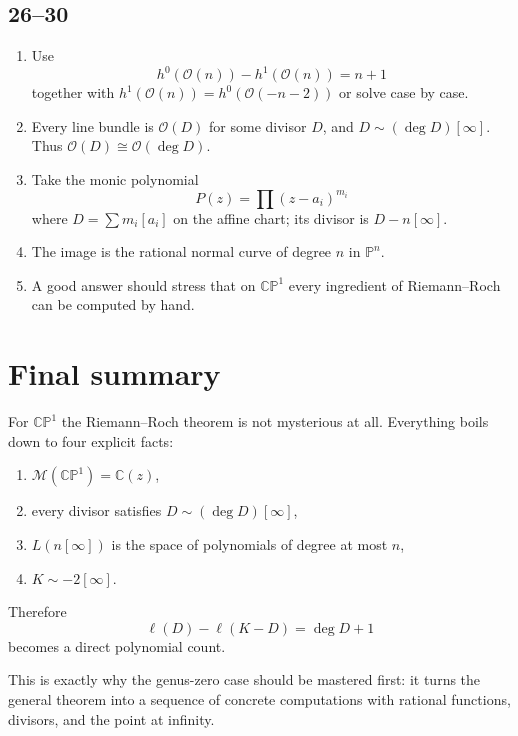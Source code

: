 \documentclass[11pt]{article}
\newcommand{\C}{\mathbb{C}}
\newcommand{\CP}{\mathbb{CP}}
\newcommand{\PP}{\mathbb{P}}
\newcommand{\OO}{\mathcal{O}}
\newcommand{\MM}{\mathcal{M}}
\newcommand{\degd}{\operatorname{deg}}
\newcommand{\ellD}{\ell}
\newcommand{\CPone}{\CP^1}
\theoremstyle{definition}
\theoremstyle{plain}
\begin{document}
\subsection*{26--30}
\begin{enumerate}[label=\textbf{\arabic*.}, leftmargin=2.5em, start=26]
    \item Use
    \[
    h^0(\OO(n))-h^1(\OO(n))=n+1
    \]
    together with $h^1(\OO(n))=h^0(\OO(-n-2))$ or solve case by case.
    \item Every line bundle is $\OO(D)$ for some divisor $D$, and $D\sim (\degd D)[\infty]$. Thus $\OO(D)\cong \OO(\degd D)$.
    \item Take the monic polynomial
    \[
    P(z)=\prod (z-a_i)^{m_i}
    \]
    where $D=\sum m_i[a_i]$ on the affine chart; its divisor is $D-n[\infty]$.
    \item The image is the rational normal curve of degree $n$ in $\PP^n$.
    \item A good answer should stress that on $\CPone$ every ingredient of Riemann--Roch can be computed by hand.
\end{enumerate}

\section{Final summary}
For $\CPone$ the Riemann--Roch theorem is not mysterious at all. Everything boils down to four explicit facts:
\begin{enumerate}[label=\arabic*., leftmargin=2em]
    \item $\MM(\CPone)=\C(z)$,
    \item every divisor satisfies $D\sim (\degd D)[\infty]$,
    \item $L(n[\infty])$ is the space of polynomials of degree at most $n$,
    \item $K\sim -2[\infty]$.
\end{enumerate}
Therefore
\[
\ellD(D)-\ellD(K-D)=\degd D+1
\]
becomes a direct polynomial count.

This is exactly why the genus-zero case should be mastered first: it turns the general theorem into a sequence of concrete computations with rational functions, divisors, and the point at infinity.
\end{document}
